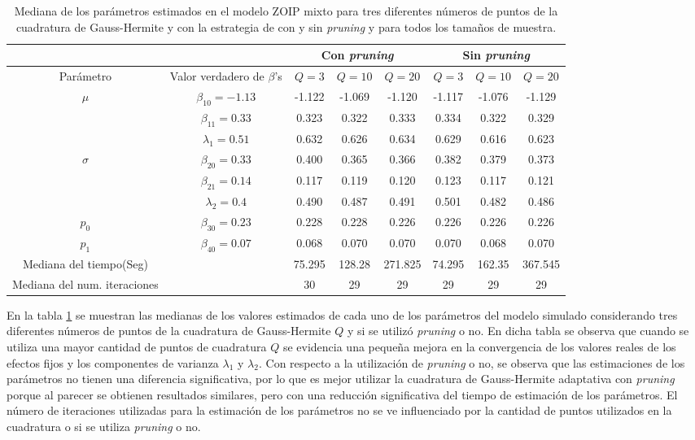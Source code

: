 \begin{table}[!hbt]
{\scriptsize
\begin{center}
\begin{tabular}{|c|c|c|c|c|c|c|c|}\hline
& & \multicolumn{3}{|c|}{Con \textit{pruning}} & \multicolumn{3}{|c|}{Sin \textit{pruning}} \\ \hline
Par\'{a}metro & Valor verdadero de $\beta$'s & $Q=3$ & $Q=10$ & $Q=20$ & $Q=3$ & $Q=10$ & $Q=20$ \\ \hline \hline
\multirow{3}{*}{$\mu$} & $\beta_{10}=-1.13$ & -1.122	& -1.069	& -1.120	& -1.117	& -1.076	& -1.129 \\ 
& $\beta_{11}=0.33$& 0.323	&0.322	&0.333	&0.334	&0.322	&0.329 \\
& $\lambda_1=0.51$ & 0.632	&0.626	&0.634	&0.629	&0.616	&0.623 \\ \hline
\multirow{3}{*}{$\sigma$} & $\beta_{20}=0.33$ & 0.400	&0.365	&0.366	&0.382	&0.379	&0.373 \\ 
& $\beta_{21}=0.14$ & 0.117	&0.119	&0.120	&0.123	&0.117	&0.121 \\
& $\lambda_2=0.4$& 0.490	&0.487	&0.491	&0.501	&0.482	&0.486 \\ \hline
$p_0$& $\beta_{30}=0.23$ &0.228	&0.228	&0.226	&0.226	&0.226	&0.226 \\ \hline
$p_1$& $\beta_{40}=0.07$ &0.068	&0.070	&0.070	&0.070	&0.068	&0.070 \\ \hline
Mediana del tiempo(Seg)& &75.295	&128.28	&271.825	&74.295	&162.35	&367.545 \\ \hline
Mediana del num. iteraciones& &30	&29	&29	&29	&29	&29 \\ \hline
\end{tabular}
\caption{Mediana de los par\'{a}metros estimados en el modelo ZOIP mixto para tres diferentes n\'{u}meros de puntos de la cuadratura de Gauss-Hermite y con la estrategia de con y sin \textit{pruning} y para todos los tama\~{n}os de muestra.}
\label{T_Sim_mix_ncua}
\end{center}
}
\end{table}

En la tabla \ref{T_Sim_mix_ncua} se muestran las medianas de los valores estimados de cada uno de los par\'{a}metros del modelo simulado considerando tres diferentes n\'{u}meros de puntos de la cuadratura de Gauss-Hermite $Q$ y si se utiliz\'{o} \textit{pruning} o no. En dicha tabla se observa que cuando se utiliza una mayor cantidad de puntos de cuadratura $Q$ se evidencia una peque\~{n}a mejora en la convergencia de los valores reales de los efectos fijos y los componentes de varianza $\lambda_1$ y $\lambda_2$. Con respecto a la utilizaci\'{o}n de \textit{pruning} o no, se observa que las estimaciones de los par\'{a}metros no tienen una diferencia significativa, por lo que es mejor utilizar la cuadratura de Gauss-Hermite adaptativa con \textit{pruning} porque al parecer se obtienen resultados similares, pero con una reducci\'{o}n significativa del tiempo de estimaci\'{o}n de los par\'{a}metros. El n\'{u}mero de iteraciones utilizadas para la estimaci\'{o}n de los par\'{a}metros no se ve influenciado por la cantidad de puntos utilizados en la cuadratura o si se utiliza \textit{pruning} o no.\\


